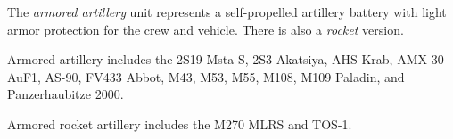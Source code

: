 
The \emph{armored artillery} unit represents a self-propelled artillery battery with light armor protection for the crew and vehicle. There is also a \emph{rocket} version.

Armored artillery includes the 
2S19 Msta-S, 
2S3 Akatsiya, 
AHS Krab, 
AMX-30 AuF1, 
AS-90,
FV433 Abbot, 
M43, 
M53, 
M55,
M108,
M109 Paladin, 
and Panzerhaubitze 2000.

Armored rocket artillery includes the M270 MLRS and TOS-1.
